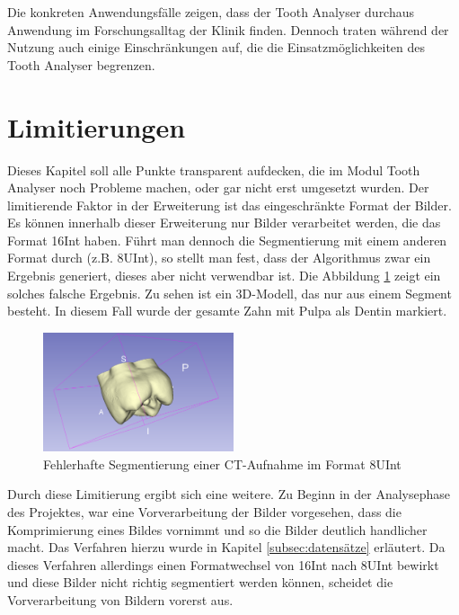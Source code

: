Die konkreten Anwendungsfälle zeigen, dass der Tooth Analyser durchaus Anwendung
im Forschungsalltag der Klinik finden. Dennoch traten während der Nutzung auch
einige Einschränkungen auf, die die Einsatzmöglichkeiten des Tooth Analyser begrenzen.

\section{Limitierungen}
\label{sec:limitierungen} Dieses Kapitel soll alle Punkte transparent aufdecken,
die im Modul Tooth Analyser noch Probleme machen, oder gar nicht erst umgesetzt wurden.
Der limitierende Faktor in der Erweiterung ist das eingeschränkte Format der
Bilder. Es können innerhalb dieser Erweiterung nur Bilder verarbeitet werden,
die das Format \ac{16Int} haben. Führt man dennoch die Segmentierung mit einem
anderen Format durch (z.B. \ac{8UInt}), so stellt man fest, dass der Algorithmus
zwar ein Ergebnis generiert, dieses aber nicht verwendbar ist. Die Abbildung
\ref{fig:3d_error} zeigt ein solches falsche Ergebnis. Zu sehen ist ein \ac{3D}-Modell,
das nur aus einem Segment besteht. In diesem Fall wurde der gesamte Zahn mit
Pulpa als Dentin markiert.

\begin{figure}[h]
	\centering
	\includegraphics[width=0.5\textwidth]{img/3d_view_error.png}
	\caption{Fehlerhafte Segmentierung einer CT-Aufnahme im Format 8UInt}
	\label{fig:3d_error}
\end{figure}

Durch diese Limitierung ergibt sich eine weitere. Zu Beginn in der Analysephase
des Projektes, war eine Vorverarbeitung der Bilder vorgesehen, dass die
Komprimierung eines Bildes vornimmt und so die Bilder deutlich handlicher macht.
Das Verfahren hierzu wurde in Kapitel \ref{subsec:datensätze} erläutert. Da
dieses Verfahren allerdings einen Formatwechsel von \ac{16Int} nach \ac{8UInt}
bewirkt und diese Bilder nicht richtig segmentiert werden können, scheidet die Vorverarbeitung
von Bildern vorerst aus.

